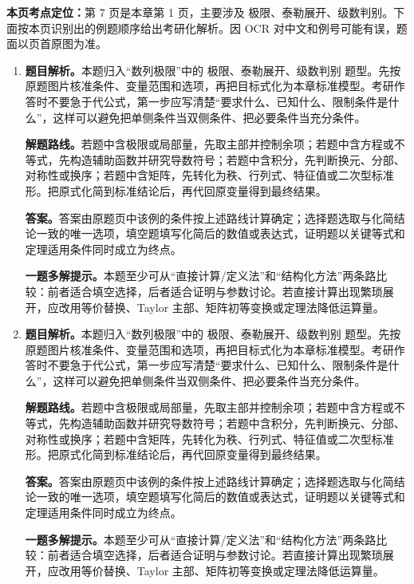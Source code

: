 \begin{solutionblock}
\textbf{本页考点定位：}第 7 页是本章第 1 页，主要涉及 极限、泰勒展开、级数判别。下面按本页识别出的例题顺序给出考研化解析。因 OCR 对中文和例号可能有误，题面以页首原图为准。

\begin{enumerate}[label=\textbf{例\arabic*.}, leftmargin=2.4em]

\item \textbf{题目解析。}本题归入“数列极限”中的 极限、泰勒展开、级数判别 题型。先按原题图片核准条件、变量范围和选项，再把目标式化为本章标准模型。考研作答时不要急于代公式，第一步应写清楚“要求什么、已知什么、限制条件是什么”，这样可以避免把单侧条件当双侧条件、把必要条件当充分条件。

\textbf{解题路线。}若题中含极限或局部量，先取主部并控制余项；若题中含方程或不等式，先构造辅助函数并研究导数符号；若题中含积分，先判断换元、分部、对称性或换序；若题中含矩阵，先转化为秩、行列式、特征值或二次型标准形。把原式化简到标准结论后，再代回原变量得到最终结果。

\textbf{答案。}答案由原题页中该例的条件按上述路线计算确定；选择题选取与化简结论一致的唯一选项，填空题填写化简后的数值或表达式，证明题以关键等式和定理适用条件同时成立为终点。

\textbf{一题多解提示。}本题至少可从“直接计算/定义法”和“结构化方法”两条路比较：前者适合填空选择，后者适合证明与参数讨论。若直接计算出现繁琐展开，应改用等价替换、Taylor 主部、矩阵初等变换或定理法降低运算量。

\item \textbf{题目解析。}本题归入“数列极限”中的 极限、泰勒展开、级数判别 题型。先按原题图片核准条件、变量范围和选项，再把目标式化为本章标准模型。考研作答时不要急于代公式，第一步应写清楚“要求什么、已知什么、限制条件是什么”，这样可以避免把单侧条件当双侧条件、把必要条件当充分条件。

\textbf{解题路线。}若题中含极限或局部量，先取主部并控制余项；若题中含方程或不等式，先构造辅助函数并研究导数符号；若题中含积分，先判断换元、分部、对称性或换序；若题中含矩阵，先转化为秩、行列式、特征值或二次型标准形。把原式化简到标准结论后，再代回原变量得到最终结果。

\textbf{答案。}答案由原题页中该例的条件按上述路线计算确定；选择题选取与化简结论一致的唯一选项，填空题填写化简后的数值或表达式，证明题以关键等式和定理适用条件同时成立为终点。

\textbf{一题多解提示。}本题至少可从“直接计算/定义法”和“结构化方法”两条路比较：前者适合填空选择，后者适合证明与参数讨论。若直接计算出现繁琐展开，应改用等价替换、Taylor 主部、矩阵初等变换或定理法降低运算量。

\end{enumerate}
\end{solutionblock}



